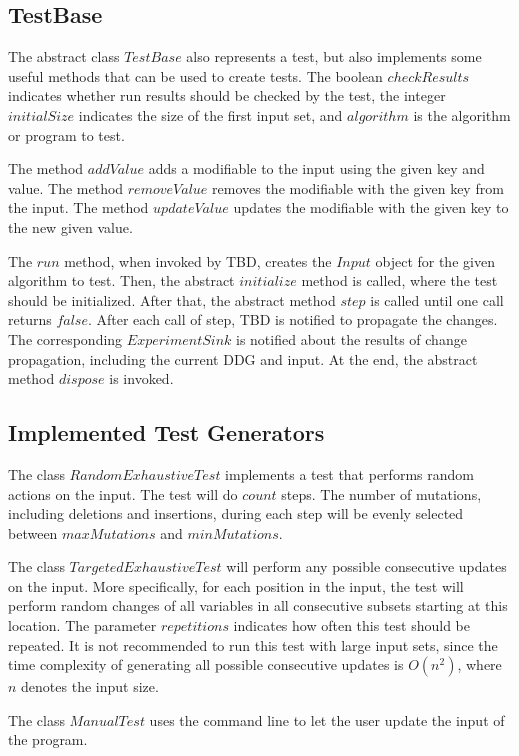 \subsection{TestBase}

The abstract class $TestBase$ also represents a test, but also implements some useful methods that can be used to create tests. The boolean $checkResults$ indicates whether run results should be checked by the test, the integer $initialSize$ indicates the size of the first input set, and $algorithm$ is the algorithm or program to test. 

The method $addValue$ adds a modifiable to the input using the given key and value. The method $removeValue$ removes the modifiable with the given key from the input. 
The method $updateValue$ updates the modifiable with the given key to the new given value. 

The $run$ method, when invoked by TBD, creates the $Input$ object for the given algorithm to test. Then, the abstract $initialize$ method is called, where the test should be initialized. After that, the abstract method $step$ is called until one call returns $false$. After each call of step, TBD is notified to propagate the changes. The corresponding $ExperimentSink$ is notified about the results of change propagation, including the current DDG and input. At the end, the abstract method $dispose$ is invoked.

\subsection{Implemented Test Generators}

The class $RandomExhaustiveTest$ implements a test that performs random actions on the input. The test will do $count$ steps. The number of mutations, including deletions and insertions, during each step will be evenly selected between $maxMutations$ and $minMutations$. 

The class $TargetedExhaustiveTest$ will perform any possible consecutive updates on the input. More specifically, for each position in the input, the test will perform random changes of all variables in all consecutive subsets starting at this location. The parameter $repetitions$ indicates how often this test should be repeated. It is not recommended to run this test with large input sets, since the time complexity of generating all possible consecutive updates is $O(n^2)$, where $n$ denotes the input size.

The class $ManualTest$ uses the command line to let the user update the input of the program. 

